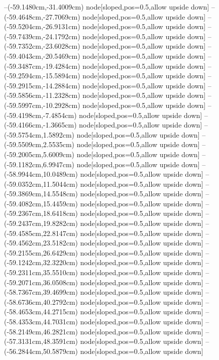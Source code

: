--(-59.1480cm,-31.4009cm) node[sloped,pos=0.5,allow upside down]{\ArrowIn}
--(-59.4648cm,-27.7069cm) node[sloped,pos=0.5,allow upside down]{\ArrowIn}
--(-59.5204cm,-26.9131cm) node[sloped,pos=0.5,allow upside down]{\arrowIn}
--(-59.7439cm,-24.1792cm) node[sloped,pos=0.5,allow upside down]{\ArrowIn}
--(-59.7352cm,-23.6028cm) node[sloped,pos=0.5,allow upside down]{\arrowIn}
--(-59.4043cm,-20.5469cm) node[sloped,pos=0.5,allow upside down]{\ArrowIn}
--(-59.3487cm,-19.4284cm) node[sloped,pos=0.5,allow upside down]{\ArrowIn}
--(-59.2594cm,-15.5894cm) node[sloped,pos=0.5,allow upside down]{\ArrowIn}
--(-59.2915cm,-14.2884cm) node[sloped,pos=0.5,allow upside down]{\ArrowIn}
--(-59.5856cm,-11.2328cm) node[sloped,pos=0.5,allow upside down]{\ArrowIn}
--(-59.5997cm,-10.2928cm) node[sloped,pos=0.5,allow upside down]{\arrowIn}
--(-59.4198cm,-7.4854cm) node[sloped,pos=0.5,allow upside down]{\ArrowIn}
--(-59.4166cm,-1.3665cm) node[sloped,pos=0.5,allow upside down]{\ArrowIn}
--(-59.5754cm,1.5892cm) node[sloped,pos=0.5,allow upside down]{\ArrowIn}
--(-59.5509cm,2.5535cm) node[sloped,pos=0.5,allow upside down]{\arrowIn}
--(-59.2005cm,5.6009cm) node[sloped,pos=0.5,allow upside down]{\ArrowIn}
--(-59.1182cm,6.9947cm) node[sloped,pos=0.5,allow upside down]{\ArrowIn}
--(-58.9944cm,10.0489cm) node[sloped,pos=0.5,allow upside down]{\ArrowIn}
--(-59.0352cm,11.5044cm) node[sloped,pos=0.5,allow upside down]{\ArrowIn}
--(-59.3869cm,14.5548cm) node[sloped,pos=0.5,allow upside down]{\ArrowIn}
--(-59.4082cm,15.4459cm) node[sloped,pos=0.5,allow upside down]{\arrowIn}
--(-59.2367cm,18.6418cm) node[sloped,pos=0.5,allow upside down]{\ArrowIn}
--(-59.2437cm,19.8282cm) node[sloped,pos=0.5,allow upside down]{\ArrowIn}
--(-59.4585cm,22.8147cm) node[sloped,pos=0.5,allow upside down]{\ArrowIn}
--(-59.4562cm,23.5182cm) node[sloped,pos=0.5,allow upside down]{\arrowIn}
--(-59.2155cm,26.6429cm) node[sloped,pos=0.5,allow upside down]{\ArrowIn}
--(-59.1242cm,32.3220cm) node[sloped,pos=0.5,allow upside down]{\ArrowIn}
--(-59.2311cm,35.5510cm) node[sloped,pos=0.5,allow upside down]{\ArrowIn}
--(-59.2071cm,36.0508cm) node[sloped,pos=0.5,allow upside down]{\arrowIn}
--(-58.7367cm,39.4699cm) node[sloped,pos=0.5,allow upside down]{\ArrowIn}
--(-58.6736cm,40.2792cm) node[sloped,pos=0.5,allow upside down]{\arrowIn}
--(-58.4653cm,44.2715cm) node[sloped,pos=0.5,allow upside down]{\ArrowIn}
--(-58.4353cm,44.7031cm) node[sloped,pos=0.5,allow upside down]{\arrowIn}
--(-58.2149cm,46.2821cm) node[sloped,pos=0.5,allow upside down]{\ArrowIn}
--(-57.3131cm,48.3591cm) node[sloped,pos=0.5,allow upside down]{\ArrowIn}
--(-56.2844cm,50.5879cm) node[sloped,pos=0.5,allow upside down]{\ArrowIn}
